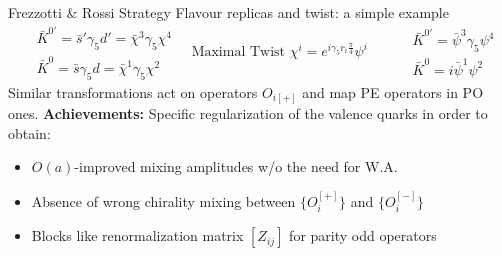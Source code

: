 \documentclass{beamer}
\begin{document}
\begin{frame}{Frezzotti \& Rossi Strategy}     
      Flavour replicas and twist: a simple example\\
      \begin{equation*}
            \begin{split}
                  & \bar{K}^{0'}=\bar s' \gamma_5 d' = \bar \chi^3 \gamma_5 \chi^4 \\
                  & \bar{K}^{0} =\bar s\gamma_5 d = \bar \chi^1 \gamma_5 \chi^2
            \end{split}
            \quad \text{Maximal Twist } \chi^i = e^{i\gamma_5 r_i \frac{\pi}{4}}\psi^i \qquad
            \begin{split}
                  & \bar{K}^{0'}=\bar \psi^3 \gamma_5 \psi^4 \\
                  & \bar{K}^{0} = i \bar \psi^1 \psi^2
            \end{split}
      \end{equation*}
      Similar transformations act on operators $O_{i[+]}$ and map PE operators in PO ones.
      \vspace{\baselineskip}
      \newline
      {\bf Achievements:}\newline
      Specific regularization of the valence quarks in order to obtain:
      \begin{itemize}%
            \item $O(a)$-improved mixing amplitudes w/o the need for W.A.
            \item Absence of wrong chirality mixing between $\{O_i^{[+]}\}$ and $\{O_i^{[-]}\}$
            \item Blocks like renormalization matrix $[Z_{ij}]$ for parity odd operators
      \end{itemize}
\end{frame}
\end{document}
